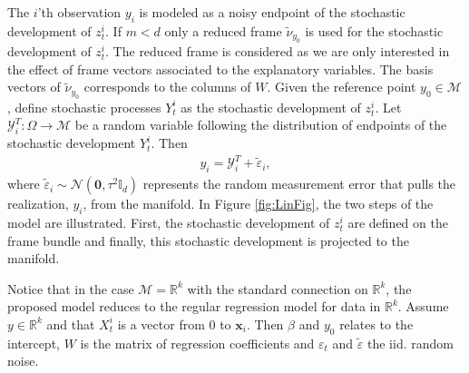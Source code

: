 \documentclass[runningheads,a4paper]{llncs}
\newcommand{\R}{\mathbb R}
\newcommand{\M}{\mathcal{M}}
\begin{document}
The $i$'th observation $y_i$ is modeled as a noisy endpoint of the stochastic development of $z_t^i$. If $m<d$ only a reduced frame $\tilde{\nu}_{y_0}$ is used for the stochastic development of $z_t^i$. The reduced frame is considered as we are only interested in the effect of frame vectors associated to the explanatory variables. The basis vectors of $\tilde{\nu}_{y_0}$ corresponds to the columns of $W$.
Given the reference point $y_0\in\M$, define stochastic processes $Y_t^{i}$ as the stochastic development of $z_t^{i}$. Let $\mathcal{Y}^T_{i}\colon\Omega\to\M$ be a random variable following the distribution of endpoints of the stochastic development $Y_t^{i}$. Then
\begin{align}
    y_{i} = \mathcal{Y}^T_i + \tilde{\varepsilon}_{i},
\end{align}
where $\tilde{\varepsilon}_{i}\sim\mathcal{N}(\boldsymbol{0},\tau^2\mathbb{I}_d)$ 
represents the random measurement error that pulls the realization, $y_i$, from the manifold. In Figure \ref{fig:LinFig}, the two steps of the model are illustrated. First, the stochastic development of $z_t^i$ are defined on the frame bundle and finally, this stochastic development is projected to the manifold.

Notice that in the case $\M = \R^k$ with the standard connection on $\R^k$, the proposed model reduces to the regular regression model for data in $\R^k$. Assume $y\in\R^k$ and that $X_t^i$ is a vector from $0$ to $\boldsymbol{x}_i$. Then $\beta$ and $y_0$ relates to the intercept, $W$ is the matrix of regression coefficients and $\varepsilon_t$ and $\tilde{\varepsilon}$ the iid. random noise. 
\end{document}
